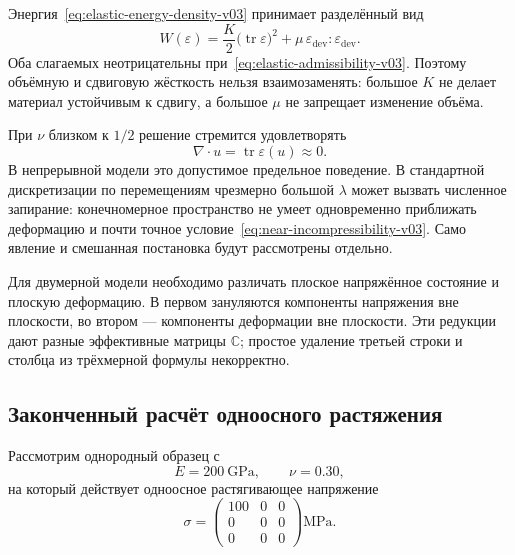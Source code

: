 Энергия~\eqref{eq:elastic-energy-density-v03} принимает разделённый вид
\begin{equation}
\label{eq:energy-vol-dev-v03}
 W(\varepsilon)
 =\frac{K}{2}\bigl(\operatorname{tr}\varepsilon\bigr)^2
 +\mu\,\varepsilon_{\mathrm{dev}}:\varepsilon_{\mathrm{dev}}.
\end{equation}
Оба слагаемых неотрицательны при~\eqref{eq:elastic-admissibility-v03}. Поэтому объёмную и сдвиговую жёсткость нельзя взаимозаменять: большое $K$ не делает материал устойчивым к сдвигу, а большое $\mu$ не запрещает изменение объёма.

При $\nu$ близком к $1/2$ решение стремится удовлетворять
\begin{equation}
\label{eq:near-incompressibility-v03}
 \nabla\cdot u
 =\operatorname{tr}\varepsilon(u)
 \approx0.
\end{equation}
В непрерывной модели это допустимое предельное поведение. В стандартной дискретизации по перемещениям чрезмерно большой $\lambda$ может вызвать численное запирание: конечномерное пространство не умеет одновременно приближать деформацию и почти точное условие~\eqref{eq:near-incompressibility-v03}. Само явление и смешанная постановка будут рассмотрены отдельно.

Для двумерной модели необходимо различать плоское напряжённое состояние и плоскую деформацию. В первом зануляются компоненты напряжения вне плоскости, во втором --- компоненты деформации вне плоскости. Эти редукции дают разные эффективные матрицы $\mathbb{C}$; простое удаление третьей строки и столбца из трёхмерной формулы некорректно.

\subsection{Законченный расчёт одноосного растяжения}
\label{subsec:uniaxial-tension-v03}

Рассмотрим однородный образец с
\begin{equation}
\label{eq:worked-material-data-v03}
 E=200\ \mathrm{GPa},
 \qquad
 \nu=0.30,
\end{equation}
на который действует одноосное растягивающее напряжение
\begin{equation}
\label{eq:worked-uniaxial-stress-v03}
 \sigma
 =\begin{pmatrix}
 100&0&0\\
 0&0&0\\
 0&0&0
 \end{pmatrix}\mathrm{MPa}.
\end{equation}

